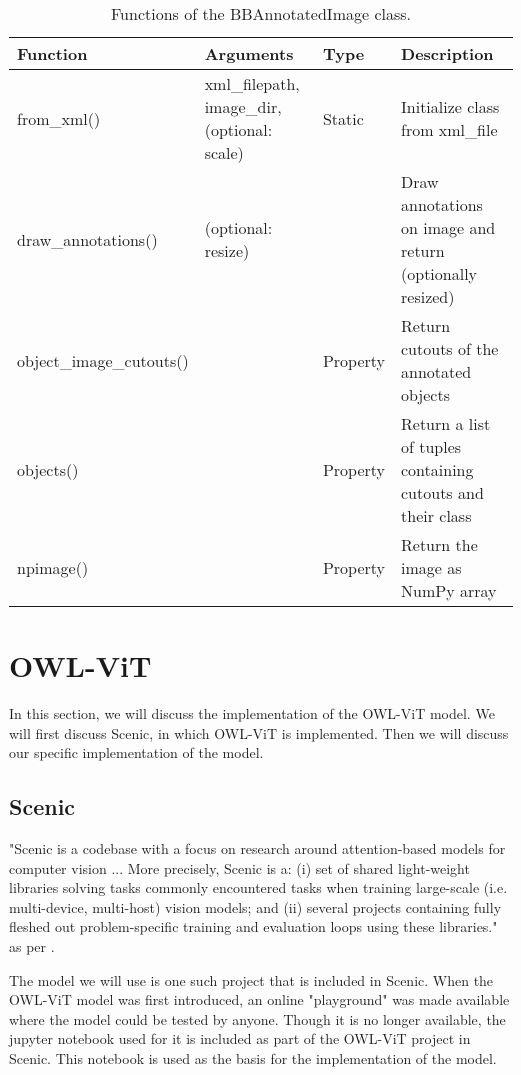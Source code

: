 \begin{table}[]
    \begin{tabular}{|l|p{3.9cm}|l|p{5cm}|}
    \hline
    Function    & Arguments                                    & Type   & Description                     \\ \hline
    from\_xml() & xml\_filepath, image\_dir, (optional: scale) & Static & Initialize class from xml\_file \\ \hline
    draw\_annotations() & (optional: resize) & & Draw annotations on image and return (optionally resized)\\ \hline
    object\_image\_cutouts() & & Property & Return cutouts of the annotated objects \\ \hline
    objects() & & Property & Return a list of tuples containing cutouts and their class \\ \hline
    npimage() & & Property & Return the image as NumPy array \\ \hline

    \end{tabular}
    \centering
    \caption{Functions of the BBAnnotatedImage class.}
    \label{tab:3_bbannotatedimage_functions}
\end{table}

\section{OWL-ViT}
In this section, we will discuss the implementation of the OWL-ViT model. We will first discuss Scenic, in which OWL-ViT is implemented. Then we will discuss our specific implementation of the model.

\subsection{Scenic}
"Scenic is a codebase with a focus on research around attention-based models for computer vision ... More precisely, Scenic is a: (i) set of shared light-weight libraries solving tasks commonly encountered tasks when training large-scale (i.e. multi-device, multi-host) vision models; and (ii) several projects containing fully fleshed out problem-specific training and evaluation loops using these libraries." as per \citet{scenic}.

The model we will use is one such project that is included in Scenic. When the OWL-ViT model was first introduced, an online "playground" was made available where the model could be tested by anyone. Though it is no longer available, the jupyter notebook used for it is included as part of the OWL-ViT project in Scenic. This notebook is used as the basis for the implementation of the model.


